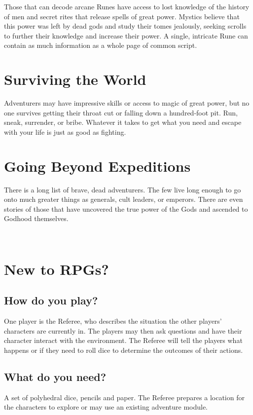 \documentclass[itdr]{subfiles}
\begin{document}
Those that can decode arcane Runes have access to lost knowledge of the history of men and secret rites that release spells of great power. Mystics believe that this power was left by dead gods and study their tomes jealously, seeking scrolls to further their knowledge and increase their power. A single, intricate Rune can contain as much information as a whole page of common script.

\vfill
\break

\section*{Surviving the World}

Adventurers may have impressive skills or access to magic of great power, but no one survives getting their throat cut or falling down a hundred-foot pit. Run, sneak, surrender, or bribe. Whatever it takes to get what you need and escape with your life is just as good as fighting.

\section*{Going Beyond Expeditions}

There is a long list of brave, dead adventurers. The few live long enough to go onto much greater things as generals, cult leaders, or emperors. There are even stories of those that have uncovered the true power of the Gods and ascended to Godhood themselves.

~\\

\section*{New to RPGs?}

\subsection*{How do you play?}
One player is the Referee, who describes the situation the other players' characters are currently in. The players may then ask questions and have their character interact with the environment. The Referee will tell the players what happens or if they need to roll dice to determine the outcomes of their actions.

\subsection*{What do you need?}
A set of polyhedral dice, pencils and paper. The Referee prepares a location for the characters to explore or may use an existing adventure module.
\end{document}

